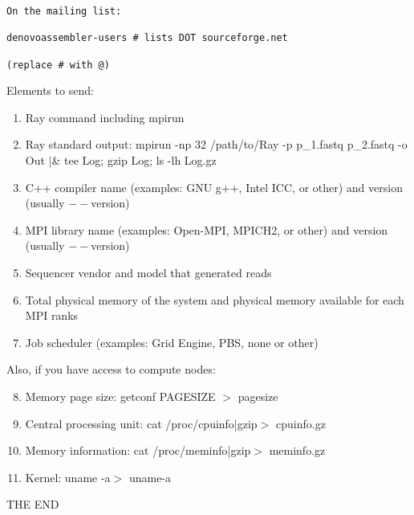 \documentclass{article}
\begin{document}
\begin{verbatim}
On the mailing list:

denovoassembler-users # lists DOT sourceforge.net

(replace # with @)

\end{verbatim}

\noindent
Elements to send:

\begin{enumerate}
 \item Ray command including mpirun
  \item Ray standard output: mpirun -np 32 /path/to/Ray -p p\_1.fastq p\_2.fastq -o Out $|$\& tee Log; gzip Log; ls -lh Log.gz
    \item  C++ compiler name (examples: GNU g++, Intel ICC, or other) and version (usually $--$version)
   \item  MPI library name (examples: Open-MPI, MPICH2, or other) and version (usually $--$version)
    \item  Sequencer vendor and model that generated reads
    \item  Total physical memory of the system and physical memory available for each MPI ranks
\item Job scheduler (examples: Grid Engine, PBS, none or other)
\end{enumerate}

\noindent
Also, if you have access to compute nodes:

\begin{enumerate}
\setcounter{enumi}{7}
   \item Memory page size: getconf PAGESIZE $>$ pagesize
   \item Central processing unit: cat /proc/cpuinfo|gzip$>$ cpuinfo.gz
   \item Memory information: cat /proc/meminfo|gzip$>$ meminfo.gz
   \item Kernel: uname -a$>$ uname-a 
\end{enumerate}


THE END
\end{document}
